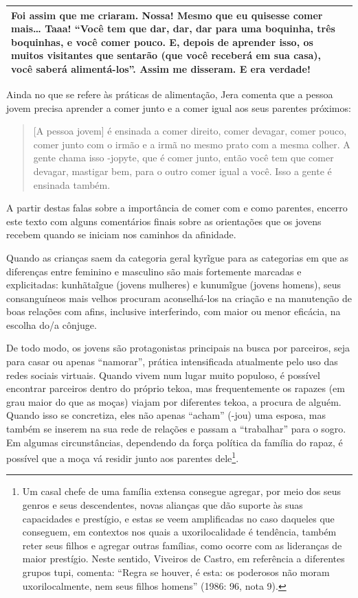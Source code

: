 \begin{flushleft}
\begin{supertabular}{m{2.8781598in}|m{2.8781598in}}
Foi assim que me criaram. Nossa! Mesmo que eu quisesse comer mais\ldots{}
Taaa! ``Você tem que dar, dar, dar para uma boquinha, três boquinhas,
e você comer pouco. E, depois de aprender isso, os muitos visitantes
que sentarão (que você receberá em sua casa), você saberá
alimentá-los''. Assim me disseram. E era verdade!\\\hline
\end{supertabular}
\end{flushleft}
Ainda no que se refere às práticas de alimentação, Jera comenta que a
pessoa jovem precisa aprender a comer junto e a comer igual aos seus
parentes próximos:

\begin{quotation}
[A pessoa jovem] é ensinada a comer direito, comer devagar, comer pouco,
comer junto com o irmão e a irmã no mesmo prato com a mesma colher. A
gente chama isso -jopyte, que é comer junto, então você tem que comer
devagar, mastigar bem, para o outro comer igual a você. Isso a gente é
ensinada também.

\end{quotation}
A partir destas falas sobre a importância de comer com e como parentes,
encerro este texto com alguns comentários finais sobre as orientações
que os jovens recebem quando se iniciam nos caminhos da afinidade.

Quando as crianças saem da categoria geral kyrĩgue para as categorias
em que as diferenças entre feminino e masculino são mais fortemente
marcadas e explicitadas: kunhãtaĩgue (jovens mulheres) e
kunumĩgue (jovens homens), seus consanguíneos mais velhos procuram
aconselhá-los na criação e na manutenção de boas relações com afins,
inclusive interferindo, com maior ou menor eficácia, na escolha do/a
cônjuge.

De todo modo, os jovens são protagonistas principais na busca por
parceiros, seja para casar ou apenas ``namorar'', prática intensificada
atualmente pelo uso das redes sociais virtuais. Quando vivem num lugar
muito populoso, é possível encontrar parceiros dentro do próprio tekoa,
mas frequentemente os rapazes (em grau maior do que as moças) viajam
por diferentes tekoa, a procura de alguém. Quando isso se concretiza,
eles não apenas ``acham'' (-jou) uma esposa, mas também se inserem na sua
rede de relações e passam a ``trabalhar'' para o sogro. Em algumas
circunstâncias, dependendo da força política da família do rapaz, é
possível que a moça vá residir junto aos parentes dele\footnote{Um
casal chefe de uma família extensa consegue agregar, por meio dos seus
genros e seus descendentes, novas alianças que dão suporte às suas
capacidades e prestígio, e estas se veem amplificadas no caso daqueles
que conseguem, em contextos nos quais a uxorilocalidade é tendência,
também reter seus filhos e agregar outras famílias, como ocorre com as
lideranças de maior prestígio. Neste sentido, Viveiros de Castro, em
referência a diferentes grupos tupi, comenta: ``Regra se houver, é esta:
os poderosos não moram uxorilocalmente, nem seus filhos homens'' (1986:
96, nota 9).}. 

